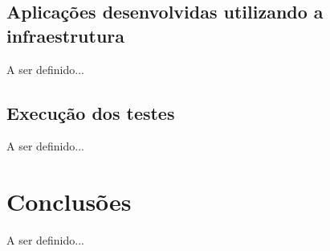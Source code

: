 \documentclass[11pt,twoside,a4paper]{book}
\renewcommand{\chaptermark}[1]{\markboth{\MakeUppercase{#1}}{}}
\begin{document}
\section{Aplicações desenvolvidas utilizando a infraestrutura}
\label{sec:aplicacoes}
A ser definido...

\section{Execução dos testes}
\label{sec:testes}
A ser definido...

\chapter{Conclusões}
\label{chap:conclusoes}
A ser definido...

\renewcommand{\chaptermark}[1]{\markboth{\MakeUppercase{\appendixname\ \thechapter}} {\MakeUppercase{#1}} }
\fancyhead[RE,LO]{}
\appendix

% 

\backmatter \singlespacing   %

\end{document}
